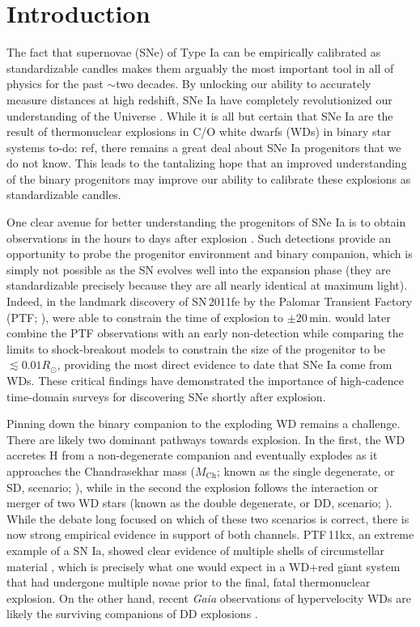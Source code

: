 \documentclass[twocolumn]{./aastex63}
\newcommand{\todo}[1]{{\color{magenta} to-do: {#1}}}
\begin{document}
\section{Introduction}

The fact that supernovae (SNe) of Type Ia can be empirically calibrated as
standardizable candles makes them arguably the most important tool in all of
physics for the past $\sim$two decades. By unlocking our ability to accurately
measure distances at high redshift, SNe Ia have completely revolutionized our
understanding of the Universe \citep{Riess98,Perlmutter99}. While it is all but
certain that SNe Ia are the result of thermonuclear explosions in C/O white
dwarfs (WDs) in binary star systems \citep{} \todo{ref}, there remains a great
deal about SNe Ia progenitors that we do not know. This leads to the tantalizing
hope that an improved understanding of the binary progenitors may improve our
ability to calibrate these explosions as standardizable candles.

One clear avenue for better understanding the progenitors of SNe Ia is to obtain
observations in the hours to days after explosion \citep{Maoz14}. Such
detections provide an opportunity to probe the progenitor environment and binary
companion, which is simply not possible as the SN evolves well into the
expansion phase (they are standardizable precisely because they are all nearly
identical at maximum light). Indeed, in the landmark discovery of SN\,2011fe by
the Palomar Transient Factory (PTF; \citealt{law09,rau09}), \citet{Nugent11}
were able to constrain the time of explosion to $\pm 20$\,min. \citet{Bloom12a}
would later combine the PTF observations with an early non-detection while
comparing the limits to shock-breakout models to constrain the size of the
progenitor to be $\lesssim 0.01 R_\odot$, providing the most direct evidence to
date that SNe Ia come from WDs. These critical findings have demonstrated the
importance of high-cadence time-domain surveys for discovering SNe shortly after
explosion.

Pinning down the binary companion to the exploding WD remains a challenge. There
are likely two dominant pathways towards explosion. In the first, the WD
accretes H from a non-degenerate companion and eventually explodes as it
approaches the Chandrasekhar mass ($M_\mathrm{Ch}$; known as the single
degenerate, or SD, scenario; \citealt{Whelan73}), while in the second the
explosion follows the interaction or merger of two WD stars (known as the double
degenerate, or DD, scenario; \citealt{Webbink84}). While the debate long focused
on which of these two scenarios is correct, there is now strong empirical
evidence in support of both channels. PTF\,11kx, an extreme example of a SN Ia,
showed clear evidence of multiple shells of circumstellar material
\citep{Dilday12}, which is precisely what one would expect in a WD$+$red giant
system that had undergone multiple novae prior to the final, fatal thermonuclear
explosion. On the other hand, recent \textit{Gaia} observations of hypervelocity
WDs are likely the surviving companions of DD explosions \citep{Shen18}.
\end{document}
